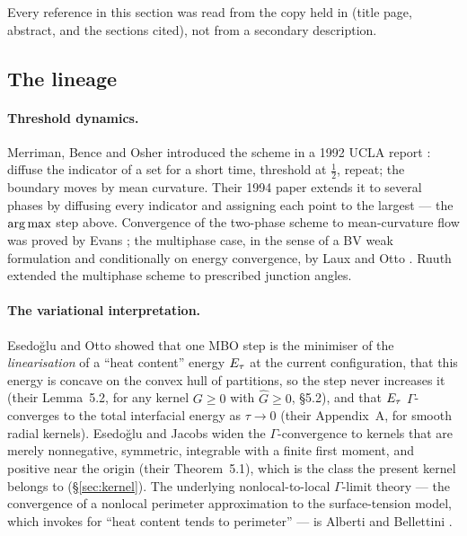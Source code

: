 \documentclass[11pt,a4paper]{article}
\begin{document}
Every reference in this section was read from the copy held in
 (title page, abstract, and the sections cited), not from a
secondary description.

\subsection{The lineage}
\label{sec:lineage}

\paragraph{Threshold dynamics.} Merriman, Bence and Osher introduced the scheme in
a 1992 UCLA report \cite{merriman1992diffusion}: diffuse the indicator of a set
for a short time, threshold at $\tfrac12$, repeat; the boundary moves by mean
curvature. Their 1994 paper \cite{merriman1994motion} extends it to several phases
by diffusing every indicator and assigning each point to the largest --- the
$\operatorname*{arg\,max}$ step above. Convergence of the two-phase scheme to mean-curvature flow
was proved by Evans \cite{evans1993convergence}; the multiphase case, in the
sense of a BV weak formulation and conditionally on energy convergence, by Laux
and Otto \cite{laux2016convergence}. Ruuth \cite{ruuth1998multiphase} extended
the multiphase scheme to prescribed junction angles.

\paragraph{The variational interpretation.} Esedo\u{g}lu and Otto
\cite{esedoglu2015threshold} showed that one MBO step is the minimiser of the
\emph{linearisation} of a ``heat content'' energy $E_\tau$ at the current
configuration, that this energy is concave on the convex hull of partitions, so
the step never increases it (their Lemma~5.2, for any kernel $G \ge 0$ with
$\widehat G \ge 0$, \S5.2), and that $E_\tau$ $\Gamma$-converges to the total
interfacial energy as $\tau \to 0$ (their Appendix~A, for smooth radial kernels).
Esedo\u{g}lu and Jacobs \cite{esedoglu2017kernels} widen the $\Gamma$-convergence
to kernels that are merely nonnegative, symmetric, integrable with a finite first
moment, and positive near the origin (their Theorem~5.1), which is the class the
present kernel belongs to (\S\ref{sec:kernel}). The underlying nonlocal-to-local $\Gamma$-limit
theory --- the convergence of a nonlocal perimeter approximation to the
surface-tension model, which \cite[ref.~1]{esedoglu2015threshold} invokes for
``heat content tends to perimeter'' --- is Alberti and Bellettini
\cite{alberti1998nonlocal}.
\end{document}
